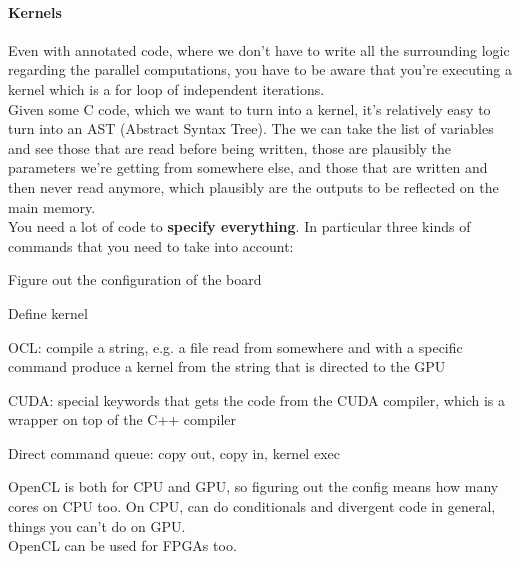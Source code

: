 \documentclass[10pt]{report}
\begin{document}
\paragraph{Kernels} Even with annotated code, where we don't have to write all the surrounding logic regarding the parallel computations, you have to be aware that you're executing a kernel which is a for loop of independent iterations.\\
Given some C code, which we want to turn into a kernel, it's relatively easy to turn into an AST (Abstract Syntax Tree). The we can take the list of variables and see those that are read before being written, those are plausibly the parameters we're getting from somewhere else, and those that are written and then never read anymore, which plausibly are the outputs to be reflected on the main memory.\\
You need a lot of code to \textbf{specify everything}. In particular three kinds of commands that you need to take into account:
\begin{list}{}{}
	\item Figure out the configuration of the board
	\item Define kernel
	\begin{list}{}{}
		\item OCL: compile a string, e.g. a file read from somewhere and with a specific command produce a kernel from the string that is directed to the GPU
		\item CUDA: special keywords that gets the code from the CUDA compiler, which is a wrapper on top of the C++ compiler
	\end{list}
	\item Direct command queue: copy out, copy in, kernel exec
\end{list}
OpenCL is both for CPU and GPU, so figuring out the config means how many cores on CPU too. On CPU, can do conditionals and divergent code in general, things you can't do on GPU.\\
OpenCL can be used for FPGAs too.
\end{document}
